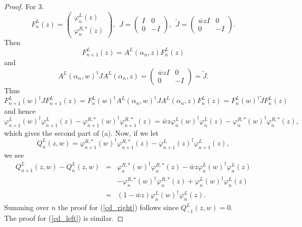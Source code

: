 \documentclass[10pt,a4paper]{amsart}
\begin{document}
\begin{proof}
\noindent For 3.
$$
F_{n}^{L}(z)=\begin{pmatrix}
\varphi_{n}^{L}(z) \\
\varphi_{n}^{R,*}(z) 
\end{pmatrix}, ~~ 
J=\begin{pmatrix}
I & 0 \\
0 & -I
\end{pmatrix}, ~~
\tilde{J}=\begin{pmatrix}
\bar{w}zI & 0 \\
0 & -I
\end{pmatrix}.
$$
Then 
$$
F_{n+1}^{L}(z)= A^{L}(\alpha_{n},z)F_{n}^{L}(z)
$$ 
and 
$$
A^{L}(\alpha_{n},w)^{\dag} J A^{L}(\alpha_{n},z)=\begin{pmatrix}
\bar{w}zI & 0 \\
0 & -I
\end{pmatrix} = \tilde{J}.
$$ 
Thus 
$$
F_{n+1}^{L}(w)^{\dag} J F_{n+1}^{L}(z) = F_{n}^{L}(w)^{\dag} A^{L}(\alpha_{n},w)^{\dag} J A^{L}(\alpha_{n},z) F_{n}^{L}(z) = F_{n}^{L}(w)^{\dag} \tilde{J} F_{n}^{L}(z)
$$ 
and hence
$$
\varphi_{n+1}^{L}(w)^{\dag}\varphi_{n+1}^{L}(z) - \varphi_{n+1}^{R,*}(w)^{\dag}\varphi_{n+1}^{R,*}(z)=\bar{w}z\varphi_{n}^{L}(w)^{\dag}\varphi_{n}^{L}(z) - \varphi_{n}^{R,*}(w)^{\dag}\varphi_{n}^{R,*}(z),
$$ 
which gives the second part of (a). Now, if we let 
$$
Q_{n}^{L}(z,w)=\varphi_{n+1}^{R,*}(w)^{\dag}\varphi_{n+1}^{R,*}(z) - \varphi_{n+1}^{L}(z)^{\dag}\varphi_{n+1}^{L}(z),
$$ 
we see 
\begin{eqnarray*}
Q_{n+1}^{L}(z,w) - Q_{n}^{L}(z,w) &=& \varphi_{n}^{R,*}(w)^{\dag}\varphi_{n}^{R,*}(z) - \bar{w}z\varphi_{n}^{L}(w)^{\dag}\varphi_{n}^{L}(z) \\
& &- \varphi_{n}^{R,*}(w)^{\dag}\varphi_{n}^{R,*}(z) + \varphi_{n}^{L}(w)^{\dag}\varphi_{n}^{L}(z)\\
&=&(1-\bar{w}z)\varphi_{n}^{L}(w)^{\dag}\varphi_{n}^{L}(z).
\end{eqnarray*}
Summing over $n$ the proof for (\ref{cd_right}) follows since $Q_{-1}^{L}(z,w)=0$.\\
The proof for (\ref{cd_left}) is similar.
\end{proof}
\end{document}
